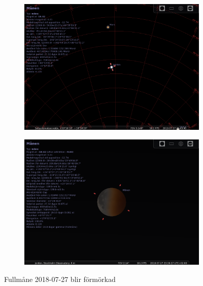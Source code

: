 \documentclass[./exercises.tex]{subfiles}
\begin{document}
\begin{itemize}
\begin{figure}[H]
     \hfill
     \begin{subfigure}[b]{0.45\textwidth}
         \centering
         \includegraphics[width=\textwidth]{Stellarium1/20180727/stellarium-002.png}
         \caption{}
         \label{fig:three sin x}
     \end{subfigure}
     \hfill
     \begin{subfigure}[b]{0.45\textwidth}
         \centering
         \includegraphics[width=\textwidth]{Stellarium1/20180727/stellarium-003.png}
         \caption{}
         \label{fig:three sin x}
     \end{subfigure}
     \hfill
        \caption{ Fullmåne 2018-07-27 blir förmörkad}
        \label{fig:perod graphs}
\end{figure}
\end{itemize}
\end{document}
